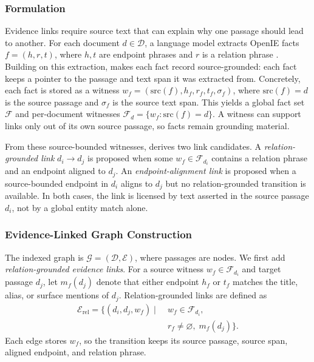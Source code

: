 \subsubsection{Formulation}
Evidence links require source text that can explain why one passage
should lead to another. For each document $d\in\mathcal{D}$, a language
model extracts OpenIE facts $f=(h,r,t)$, where $h,t$ are endpoint
phrases and $r$ is a relation phrase
\citep{angeli2015leveraging}. Building on this extraction,
\methodname{} makes each fact record source-grounded: each fact keeps a pointer
to the passage and text span it was extracted from. Concretely, each fact
is stored as a witness
$w_f=(\mathrm{src}(f),h_f,r_f,t_f,\sigma_f)$, where
$\mathrm{src}(f)=d$ is the source passage and $\sigma_f$ is the source
text span. This yields a global fact set $\mathcal{F}$ and
per-document witnesses
$\mathcal{F}_d=\{w_f:\mathrm{src}(f)=d\}$. A witness can support links
only out of its own source passage, so facts remain grounding material.

From these source-bounded witnesses, \methodname{} derives two link
candidates. A \emph{relation-grounded link} $d_i\!\to\!d_j$ is proposed
when some $w_f\in\mathcal{F}_{d_i}$ contains a relation phrase and an
endpoint aligned to $d_j$. An \emph{endpoint-alignment link} is proposed
when a source-bounded endpoint in $d_i$ aligns to $d_j$ but no
relation-grounded transition is available. In both cases, the link is
licensed by text asserted in the source passage $d_i$, not by a global
entity match alone.

\subsubsection{Evidence-Linked Graph Construction}
The indexed graph is $\mathcal{G}=(\mathcal{D},\mathcal{E})$, where
passages are nodes. We first add \emph{relation-grounded evidence links}.
For a source witness $w_f\in\mathcal{F}_{d_i}$ and target passage $d_j$,
let $m_f(d_j)$ denote that either endpoint $h_f$ or $t_f$ matches the
title, alias, or surface mentions of $d_j$. Relation-grounded links are
defined as
\begin{equation}
\label{eq:relation-link}
\begin{aligned}
\mathcal{E}_{\mathrm{rel}}=\{(d_i,d_j,w_f)\mid\;
& w_f\in\mathcal{F}_{d_i},\\
& r_f\neq\varnothing,\;m_f(d_j)\}.
\end{aligned}
\end{equation}
Each edge stores $w_f$, so the transition keeps its source passage,
source span, aligned endpoint, and relation phrase.

